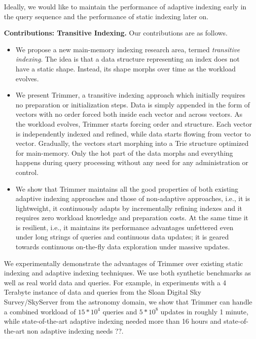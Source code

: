 Ideally, we would like to maintain the performance of adaptive indexing early in the query sequence 
and the performance of static indexing later on.


\textbf{Contributions: Transitive Indexing.}
Our contributions are as follows.
\begin{itemize}

\item We propose a new main-memory indexing research area, termed 
\emph{transitive indexing}.
The idea is that a data structure representing an index does not have a static shape.
Instead, its shape morphs over time as the workload evolves.

\item
We present Trimmer, a transitive indexing approach which  
initially requires no preparation or initialization steps.
Data is simply appended in the form of vectors with no order forced
both inside each vector and across vectors.
As the workload evolves, Trimmer starts forcing order and structure.
Each vector is independently indexed and refined, while data starts flowing from vector to vector.
Gradually, the vectors start morphing into a Trie structure optimized for main-memory.
Only the hot part of the data morphs and everything happens during query processing
without any need for any administration or control.

\item
We show that Trimmer  maintains all the good properties of 
both existing adaptive indexing approaches and those of non-adaptive approaches, 
i.e., it is lightweight, it continuously adapts by incrementally refining indexes
and it requires zero workload knowledge and preparation costs.
At the same time it is resilient, i.e., it maintains its performance advantages
unfettered even under long strings of queries and continuous data updates;
it is geared towards continuous on-the-fly data exploration under massive updates. 

\end{itemize}

We experimentally demonstrate the advantages of Trimmer
over existing static indexing and adaptive indexing techniques. 
We use both synthetic benchmarks as well as real world data and queries.
For example, in experiments with a 4 Terabyte instance of 
data and queries from the Sloan Digital Sky Survey/SkyServer
from the astronomy domain,
we show that Trimmer can handle a combined workload of $15*10^4$ queries and $5*10^8$ updates in roughly 1 minute, while 
state-of-the-art adaptive indexing needed more than 16 hours and state-of-the-art non adaptive indexing needs ??. 

